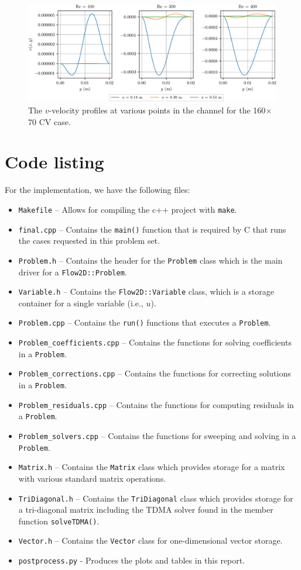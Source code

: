 \documentclass{article}
\begin{document}
\begin{figure}[H]
	\centering
	\includegraphics[width=0.9\linewidth]{../results/2_v}
	\caption{The $v$-velocity profiles at various points in the channel for the 160$\times$70 CV case.}
	\label{fig:2_v}
\end{figure}


\section*{Code listing}

For the implementation, we have the following files:
\begin{itemize}
	\item \texttt{Makefile} -- Allows for compiling the c++ project with \texttt{make}.
	\item \texttt{final.cpp} -- Contains the \texttt{main()} function that is required by C that runs the cases requested in this problem set.
	\item \texttt{Problem.h} -- Contains the header for the \texttt{Problem} class which is the main driver for a \texttt{Flow2D::Problem}.
	\item \texttt{Variable.h} -- Contains the \texttt{Flow2D::Variable} class, which is a storage container for a single variable (i.e., $u$).
	\item \texttt{Problem.cpp} -- Contains the \texttt{run()} functions that executes a \texttt{Problem}.
	\item \texttt{Problem\_coefficients.cpp} -- Contains the functions for solving coefficients in a \texttt{Problem}.
	\item \texttt{Problem\_corrections.cpp} -- Contains the functions for correcting solutions in a \texttt{Problem}.
	\item \texttt{Problem\_residuals.cpp} -- Contains the functions for computing residuals in a \texttt{Problem}.
	\item \texttt{Problem\_solvers.cpp} -- Contains the functions for sweeping and solving in a \texttt{Problem}.
	\item \texttt{Matrix.h} -- Contains the \texttt{Matrix} class which provides storage for a matrix with various standard matrix operations.
	\item \texttt{TriDiagonal.h} -- Contains the \texttt{TriDiagonal} class which provides storage for a tri-diagonal matrix including the TDMA solver found in the member function \texttt{solveTDMA()}.
	\item \texttt{Vector.h} -- Contains the \texttt{Vector} class for one-dimensional vector storage.
	\item \texttt{postprocess.py} - Produces the plots and tables in this report.
\end{itemize}
\end{document}

